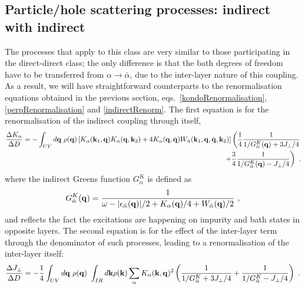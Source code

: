 \documentclass[%
reprint,
superscriptaddress,
groupedaddress,
superscriptaddress,
onecolumn,
10pt
]{revtex4-2}
\begin{document}
\subsection{Particle/hole scattering processes: indirect with indirect}
The processes that apply to this class are very similar to those participating in the direct-direct class; the only difference is that the bath degrees of freedom have to be transferred from \(\alpha \to \bar\alpha\), due to the inter-layer nature of this coupling. As a result, we will have straightforward counterparts to the renormalisation equations obtained in the previous section, eqs.~\ref{kondoRenormalisation}, \ref{perpRenormalisation} and \ref{indirectRenorm}. The first equation is for the renormalisation of the indirect coupling through itself,
\begin{equation}\begin{aligned}
	\frac{\Delta K_\alpha}{\Delta D} = -\int_{UV} d{\bf q} ~\rho({\bf q}) \left[K_\alpha({\bf k}_1, {\bf q})K_\alpha({\bf q}, {\bf k}_2) + 4K_\alpha({\bf q}, \bar {\bf q})W_{\bar\alpha}({\bf k}_1, {\bf q}, \bar {\bf q}, {\bf k}_2)\right]\left(\frac{1}{4}\frac{1}{1/ G_{\bar\alpha}^K({\bf q}) + 3J_\perp/4}\right.\\
	\left. + \frac{3}{4}\frac{1}{1/ G_{\bar\alpha}^K({\bf q}) - J_\perp/4}\right)~.
\end{aligned}\end{equation}
where the indirect Greens function \( G^K_\alpha\) is defined as
\begin{equation}\begin{aligned}
	G_{\bar\alpha}^K({\bf q}) = \frac{1}{\omega - |\epsilon_{\bar\alpha}({\bf q})| / 2 + K_\alpha({\bf q}) / 4 + W_{\bar\alpha}({\bf q}) / 2}~,
\end{aligned}\end{equation}
and reflects the fact the excitations are happening on impurity and bath states in opposite layers. The second equation is for the effect of the inter-layer term through the denominator of such processes, leading to a renormalisation of the inter-layer itself:
\begin{equation}\begin{aligned}
	\frac{\Delta J_\perp}{\Delta D} = -\frac{1}{4}\int_{UV} d{\bf q} ~\rho({\bf q})~\int_{IR} d{\bf k} \rho({\bf k}) \sum_\alpha K_\alpha({\bf k}, {\bf q})^2\left(\frac{1}{1/ G_{\bar\alpha}^K + 3J_\perp/4} + \frac{1}{1/ G_{\bar\alpha}^K - J_\perp/4}\right)~.
\end{aligned}\end{equation}
\end{document}
